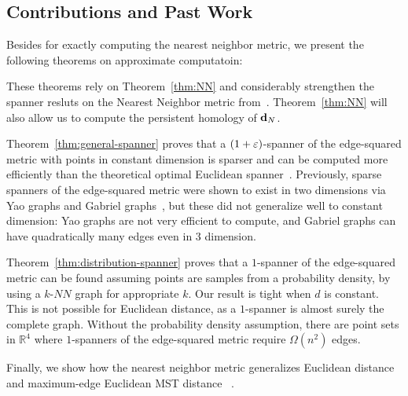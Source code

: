 \subsection{Contributions and Past Work}
Besides for exactly computing the nearest neighbor metric, we present the
following theorems on approximate computatoin:

 
These theorems rely on Theorem~\ref{thm:NN} and considerably strengthen the
spanner resluts on the Nearest Neighbor metric
from~\cite{cohen15approximating}. Theorem~\ref{thm:NN} will also allow us
to compute the persistent homology of $\mathbf{d}_N$.

Theorem~\ref{thm:general-spanner} proves that a $(1+\varepsilon)$-spanner of the
edge-squared metric with points in constant dimension is sparser and can be
computed more efficiently than the theoretical optimal Euclidean
spanner~\cite{}.  
Previously, sparse spanners of the edge-squared metric were shown to exist in two
dimensions via Yao graphs and Gabriel graphs~\cite{LiWan2001}, but these
did not generalize well to constant dimension: Yao
graphs are not very efficient to compute, and Gabriel graphs can have
quadratically many edges even in $3$ dimension.

Theorem~\ref{thm:distribution-spanner} proves that a $1$-spanner of
the edge-squared metric can be found assuming points are samples from a
probability density, by using a $k$-$NN$ graph for
appropriate $k$. Our result is tight when $d$ is constant. This
is not possible for Euclidean distance, as a $1$-spanner is almost
surely the complete graph. Without the probability density
assumption, there are point sets in $\mathbb{R}^4$ where
$1$-spanners
of the edge-squared metric require $\Omega(n^2)$ edges.

Finally, we show how the nearest neighbor metric generalizes Euclidean
distance and maximum-edge Euclidean MST distance ~\cite{LiWan2001}.

